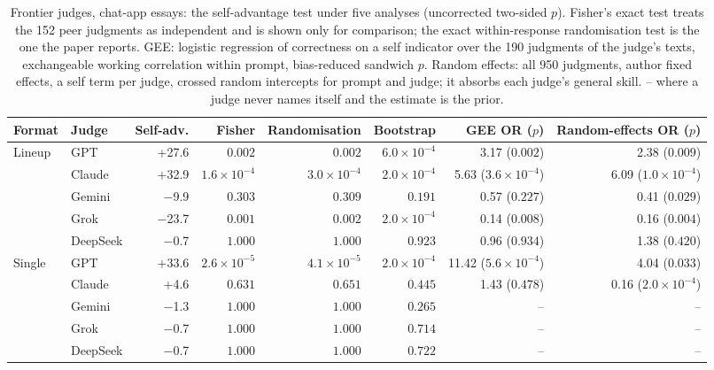 \begin{table}[t]
\centering\small
\setlength\tabcolsep{4pt}
\begin{adjustbox}{max width=\linewidth}
\begin{tabular}{ll r rrr rr}
\toprule
Format & Judge & Self-adv. & Fisher & Randomisation & Bootstrap & GEE OR ($p$) & Random-effects OR ($p$) \\
\midrule
Lineup & GPT & +27.6 & $0.002$ & $0.002$ & $6.0\times10^{-4}$ & 3.17 ($0.002$) & 2.38 ($0.009$) \\
 & Claude & +32.9 & $1.6\times10^{-4}$ & $3.0\times10^{-4}$ & $2.0\times10^{-4}$ & 5.63 ($3.6\times10^{-4}$) & 6.09 ($1.0\times10^{-4}$) \\
 & Gemini & $-$9.9 & $0.303$ & $0.309$ & $0.191$ & 0.57 ($0.227$) & 0.41 ($0.029$) \\
 & Grok & $-$23.7 & $0.001$ & $0.002$ & $2.0\times10^{-4}$ & 0.14 ($0.008$) & 0.16 ($0.004$) \\
 & DeepSeek & $-$0.7 & $1.000$ & $1.000$ & $0.923$ & 0.96 ($0.934$) & 1.38 ($0.420$) \\
\midrule
Single & GPT & +33.6 & $2.6\times10^{-5}$ & $4.1\times10^{-5}$ & $2.0\times10^{-4}$ & 11.42 ($5.6\times10^{-4}$) & 4.04 ($0.033$) \\
 & Claude & +4.6 & $0.631$ & $0.651$ & $0.445$ & 1.43 ($0.478$) & 0.16 ($2.0\times10^{-4}$) \\
 & Gemini & $-$1.3 & $1.000$ & $1.000$ & $0.265$ & -- & -- \\
 & Grok & $-$0.7 & $1.000$ & $1.000$ & $0.714$ & -- & -- \\
 & DeepSeek & $-$0.7 & $1.000$ & $1.000$ & $0.722$ & -- & -- \\
\bottomrule
\end{tabular}
\end{adjustbox}
\caption{Frontier judges, chat-app essays: the self-advantage test under five analyses (uncorrected two-sided $p$). Fisher's exact test treats the 152 peer judgments as independent and is shown only for comparison; the exact within-response randomisation test is the one the paper reports. GEE: logistic regression of correctness on a self indicator over the 190 judgments of the judge's texts, exchangeable working correlation within prompt, bias-reduced sandwich $p$. Random effects: all 950 judgments, author fixed effects, a self term per judge, crossed random intercepts for prompt and judge; it absorbs each judge's general skill. -- where a judge never names itself and the estimate is the prior.}
\label{tab:clustered}
\end{table}
